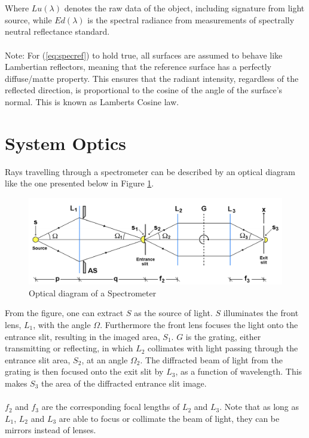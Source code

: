 \\\\
Where $Lu(\lambda)$ denotes the raw data of the object, including signature from light source, while $Ed(\lambda)$ is the spectral radiance from measurements of spectrally neutral reflectance standard.
\\\\
Note: For (\ref{eq:specref}) to hold true, all surfaces are assumed to behave like Lambertian reflectors, meaning that the reference surface has a perfectly diffuse/matte property. This ensures that the radiant intensity, regardless of the reflected direction, is proportional to the cosine of the angle of the surface's normal. This is known as Lamberts Cosine law. 



\section{System Optics} \label{sec:sysopt}
Rays travelling through a spectrometer can be described by an optical diagram like the one presented below in Figure \ref{fig:sysopt}.
\begin{figure}[H]
    \centering
    \includegraphics[width = 12cm]{Images/theory/sysop.png}
    \caption{Optical diagram of a Spectrometer}
    \label{fig:sysopt}
\end{figure}
\noindent
From the figure, one can extract $S$ as the source of light. $S$ illuminates the front lens, $L_1$, with the angle $\Omega$. Furthermore the front lens focuses the light onto the entrance slit, resulting in the imaged area, $S_1$. $G$ is the grating, either transmitting or reflecting, in which $L_2$ collimates with light passing through the entrance slit area, $S_2$, at an angle  $\Omega_2$. The diffracted beam of light from the grating is then focused onto the exit slit by $L_3$, as a function of wavelength. This makes $S_3$ the area of the diffracted entrance slit image. 
\\\\
$f_2$ and $f_3$ are the corresponding focal lengths of $L_2$ and $L_3$. Note that as long as $L_1$, $L_2$ and $L_3$ are able to focus or collimate the beam of light, they can be mirrors instead of lenses. 


